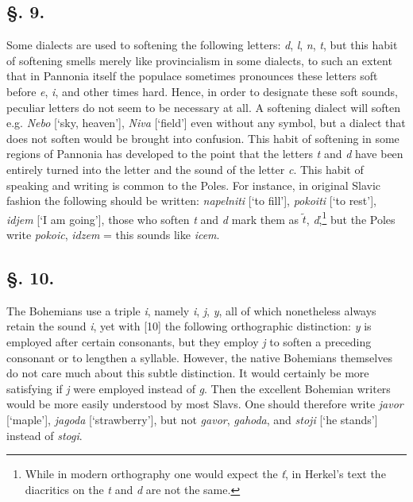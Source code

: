 \subsection*{\hspace*{\fill}§. 9.\hspace*{\fill}}

Some dialects are used to softening the following letters: \textit{d}, \textit{l}, \textit{n}, \textit{t}, but this habit of softening smells merely like provincialism in some dialects, to such an extent that in Pannonia itself the populace sometimes pronounces these letters soft before \textit{e}, \textit{i}, and other times hard. Hence, in order to designate these soft sounds, peculiar letters do not seem to be necessary at all. A softening dialect will soften e.g. \textit{Nebo} [‘sky, heaven’], \textit{Niva} [‘field’] even without any symbol, but a dialect that does not soften would be brought into confusion. This habit of softening in some regions of Pannonia has developed to the point that the letters \textit{t} and \textit{d} have been entirely turned into the letter and the sound of the letter \textit{c}. This habit of speaking and writing is common to the Poles. For instance, in original Slavic fashion the following should be written: \textit{napelniti} [‘to fill’], \textit{pokoiti} [‘to rest’], \textit{idjem} [‘I am going’], those who soften \textit{t} and \textit{d} mark them as \textit{$\tilde{t}$}, \textit{ď},\footnote{While in modern orthography one would expect the \textit{ť}, in Herkel’s text the diacritics on the \textit{t} and \textit{d} are not the same.} but the Poles write \textit{pokoic}, \textit{idzem} = this sounds like \textit{icem}.

\subsection*{\hspace*{\fill}§. 10.\hspace*{\fill}}

The Bohemians use a triple \textit{i}, namely \textit{i}, \textit{j}, \textit{y}, all of which nonetheless always retain the sound \textit{i}, yet with [10] the following orthographic distinction: \textit{y} is employed after certain consonants, but they employ \textit{j} to soften a preceding consonant or to lengthen a syllable. However, the native Bohemians themselves do not care much about this subtle distinction. It would certainly be more satisfying if \textit{j} were employed instead of \textit{g}. Then the excellent Bohemian writers would be more easily understood by most Slavs. One should therefore write \textit{javor} [‘maple’], \textit{jagoda} [‘strawberry’], but not \textit{gavor}, \textit{gahoda}, and \textit{stoji} [‘he stands’] instead of \textit{stogi}.

